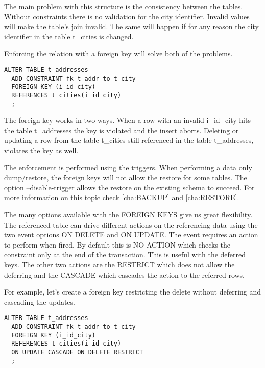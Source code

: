 The main problem with this structure is the consistency between the tables. Without constraints
there is no validation for the city identifier. Invalid values will make the table's join invalid. The
same will happen if for any reason the city identifier in the table t\_cities is changed.\newline

Enforcing the relation with a foreign key will solve both of the problems.

\begin{lstlisting}[style=pgsql]
ALTER TABLE t_addresses
  ADD CONSTRAINT fk_t_addr_to_t_city
  FOREIGN KEY (i_id_city)
  REFERENCES t_cities(i_id_city)
  ;

\end{lstlisting}

The foreign key works in two ways. When a row with an invalid i\_id\_city hits the table t\_addresses
the key is violated and the insert aborts. Deleting or updating a row from the table t\_cities still
referenced in the table t\_addresses, violates the key as well.\newline

The enforcement is performed using the triggers. When performing a data only dump/restore, the
foreign keys will not allow the restore for some tables. The option --disable-trigger allows the restore
on the existing schema to succeed. For more information on this topic check \ref{cha:BACKUP}
and \ref{cha:RESTORE}.\newline

The many options available with the FOREIGN KEYS give us great flexibility. The referenced table can
drive different actions on the referencing data using the two event options ON DELETE and ON UPDATE. The event requires an action to perform when
fired. By default this is NO ACTION which checks the constraint only at the end of the transaction. This
is useful with the deferred keys. The other two actions are the RESTRICT which does not allow the
deferring and  the CASCADE which cascades the action to the referred rows.

For example, let's create a foreign key restricting the delete without deferring and cascading the
updates.

\begin{lstlisting}[style=pgsql]
ALTER TABLE t_addresses
  ADD CONSTRAINT fk_t_addr_to_t_city
  FOREIGN KEY (i_id_city)
  REFERENCES t_cities(i_id_city)
  ON UPDATE CASCADE ON DELETE RESTRICT
  ;

\end{lstlisting}

